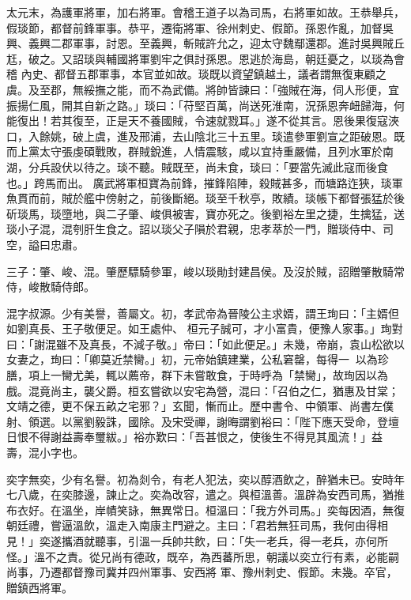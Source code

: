 \begin{pinyinscope}
 太元末，為護軍將軍，加右將軍。會稽王道子以為司馬，右將軍如故。王恭舉兵，假琰節，都督前鋒軍事。恭平，遷衛將軍、徐州刺史、假節。孫恩作亂，加督吳興、義興二郡軍事，討恩。至義興，斬賊許允之，迎太守魏鄢還郡。進討吳興賊丘尪，破之。又詔琰與輔國將軍劉牢之俱討孫恩。恩逃於海島，朝廷憂之，以琰為會稽
 內史、都督五郡軍事，本官並如故。琰既以資望鎮越土，議者謂無復東顧之虞。及至郡，無綏撫之能，而不為武備。將帥皆諫曰：「強賊在海，伺人形便，宜振揚仁風，開其自新之路。」琰曰：「苻堅百萬，尚送死淮南，況孫恩奔衄歸海，何能復出！若其復至，正是天不養國賊，令速就戮耳。」遂不從其言。恩後果復寇浹口，入餘姚，破上虞，進及邢浦，去山陰北三十五里。琰遣參軍劉宣之距破恩。既而上黨太守張虔碩戰敗，群賊銳進，人情震駭，咸以宜持重嚴備，且列水軍於南湖，分兵設伏以待之。琰不聽。賊既至，尚未食，琰曰：「要當先滅此寇而後食也。」跨馬而出。
 廣武將軍桓寶為前鋒，摧鋒陷陣，殺賊甚多，而塘路迮狹，琰軍魚貫而前，賊於艦中傍射之，前後斷絕。琰至千秋亭，敗績。琰帳下都督張猛於後斫琰馬，琰墮地，與二子肇、峻俱被害，寶亦死之。後劉裕左里之捷，生擒猛，送琰小子混，混刳肝生食之。詔以琰父子隕於君親，忠孝萃於一門，贈琰侍中、司空，謚曰忠肅。



 三子：肇、峻、混。肇歷驃騎參軍，峻以琰勛封建昌侯。及沒於賊，詔贈肇散騎常侍，峻散騎侍郎。



 混字叔源。少有美譽，善屬文。初，孝武帝為晉陵公主求婿，謂王珣曰：「主婿但如劉真長、王子敬便足。如王處仲、
 桓元子誠可，才小富貴，便豫人家事。」珣對曰：「謝混雖不及真長，不減子敬。」帝曰：「如此便足。」未幾，帝崩，袁山松欲以女妻之，珣曰：「卿莫近禁臠。」初，元帝始鎮建業，公私窘罄，每得一，以為珍膳，項上一臠尤美，輒以薦帝，群下未嘗敢食，于時呼為「禁臠」，故珣因以為戲。混竟尚主，襲父爵。桓玄嘗欲以安宅為營，混曰：「召伯之仁，猶惠及甘棠；文靖之德，更不保五畝之宅邪？」玄聞，慚而止。歷中書令、中領軍、尚書左僕射、領選。以黨劉毅誅，國除。及宋受禪，謝晦謂劉裕曰：「陛下應天受命，登壇日恨不得謝益壽奉璽紱。」裕亦歎曰：「吾甚恨之，使後生不得見其風流！」益
 壽，混小字也。



 奕字無奕，少有名譽。初為剡令，有老人犯法，奕以醇酒飲之，醉猶未已。安時年七八歲，在奕膝邊，諫止之。奕為改容，遣之。與桓溫善。溫辟為安西司馬，猶推布衣好。在溫坐，岸幘笑詠，無異常日。桓溫曰：「我方外司馬。」奕每因酒，無復朝廷禮，嘗逼溫飲，溫走入南康主門避之。主曰：「君若無狂司馬，我何由得相見！」奕遂攜酒就聽事，引溫一兵帥共飲，曰：「失一老兵，得一老兵，亦何所怪。」溫不之責。從兄尚有德政，既卒，為西蕃所思，朝議以奕立行有素，必能嗣尚事，乃遷都督豫司冀并四州軍事、安西將
 軍、豫州刺史、假節。未幾。卒官，贈鎮西將軍。




\end{pinyinscope}
